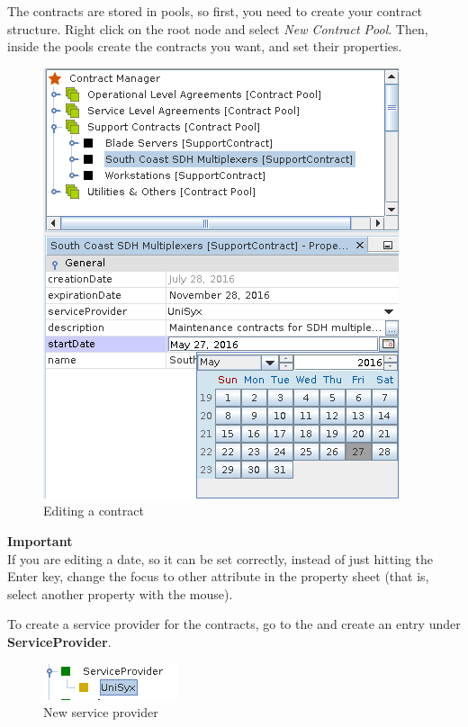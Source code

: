 \documentclass[a4paper]{article}
\begin{document}
		The contracts are stored in pools, so first, you need to create your contract structure. Right click on the root node and select \textit{New Contract Pool}. Then, inside the pools create the contracts you want, and set their properties.
		\begin{figure}[h!]
			\centering
			\includegraphics[width=0.4\linewidth]{img/contract_manager_editing_properties.png}
			\caption{Editing a contract}
			\label{fig:contract_manager_editing_properties}
		\end{figure}		
		\begin{framed} {\large \textbf{Important}}\\
			If you are editing a date, so it can be set correctly, instead of just hitting the Enter key, change the focus to other attribute in the property sheet (that is, select another property with the mouse).							
		\end{framed}
		To create a service provider for the contracts, go to the \textbf{} and create an entry under \textbf{ServiceProvider}.
		\begin{figure}[h!]
			\centering
			\includegraphics[width=0.2\linewidth]{img/contract_manager_service_providers.png}
			\caption{New service provider}
			\label{fig:contract_manager_service_providers}
		\end{figure}
		
\end{document}
